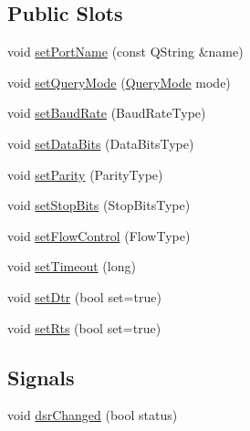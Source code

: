 \subsection*{Public Slots}
\begin{DoxyCompactItemize}
\item 
void \hyperlink{classQextSerialPort_a9be0f083d807d93bcf30554a2a272d93}{set\+Port\+Name} (const Q\+String \&name)
\item 
void \hyperlink{classQextSerialPort_add89288d28c60a20cbd087576e17b05d}{set\+Query\+Mode} (\hyperlink{classQextSerialPort_a6002128d7351ea9a958d6a6d1fc6b9bd}{Query\+Mode} mode)
\item 
void \hyperlink{classQextSerialPort_a034505ee74b7e53492adfe08cdc4ce6c}{set\+Baud\+Rate} (Baud\+Rate\+Type)
\item 
void \hyperlink{classQextSerialPort_aec2dde714ac2e085d264caba18cc4eb6}{set\+Data\+Bits} (Data\+Bits\+Type)
\item 
void \hyperlink{classQextSerialPort_aae887a42778a47b36b417278a64cdcf2}{set\+Parity} (Parity\+Type)
\item 
void \hyperlink{classQextSerialPort_a2ad017cb814115af9d63a9cfa2a4e171}{set\+Stop\+Bits} (Stop\+Bits\+Type)
\item 
void \hyperlink{classQextSerialPort_af00d9366ac48869d37dab8874f5e8e44}{set\+Flow\+Control} (Flow\+Type)
\item 
void \hyperlink{classQextSerialPort_a7a0f74ee86b1b38fc2a42243a7aea87d}{set\+Timeout} (long)
\item 
void \hyperlink{classQextSerialPort_a0de93c64cb2e2d663ddd396294e25356}{set\+Dtr} (bool set=true)
\item 
void \hyperlink{classQextSerialPort_a699ca97dbee732d19ff224de5c91befe}{set\+Rts} (bool set=true)
\end{DoxyCompactItemize}
\subsection*{Signals}
\begin{DoxyCompactItemize}
\item 
void \hyperlink{classQextSerialPort_a4cf10f07eff887097a9cd6509ca2abc6}{dsr\+Changed} (bool status)
\end{DoxyCompactItemize}
